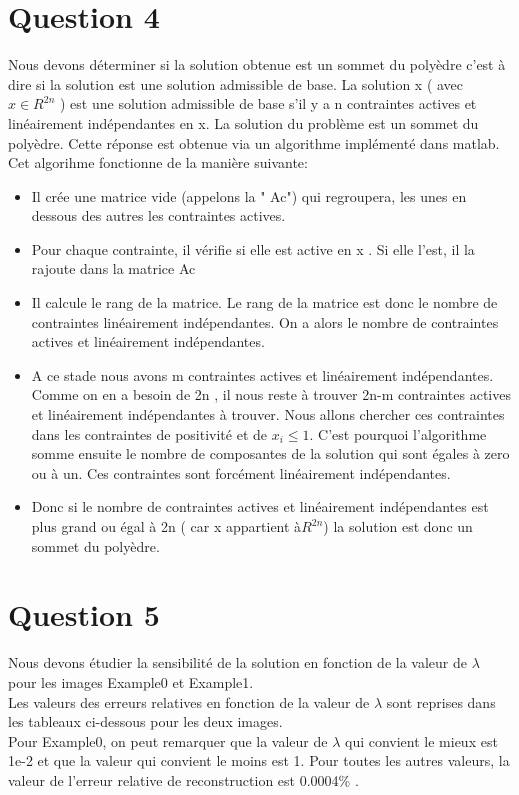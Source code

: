 \documentclass[a4paper, 12pt]{article}
\begin{document}
\section{Question 4}
	Nous devons déterminer si la solution obtenue est un sommet du polyèdre c'est à dire si la solution est une solution admissible de base. La solution x ( avec $ x \in R^{2n}$ ) est une solution admissible de base s'il y a n contraintes actives et linéairement indépendantes en x. 
	La solution du problème est un sommet du polyèdre. Cette réponse est obtenue via un algorithme implémenté dans matlab. Cet algorihme fonctionne de la manière suivante:
\begin{itemize}
	\item Il crée une matrice vide (appelons la " Ac") qui  regroupera,  les unes en dessous des autres les contraintes actives.
	\item Pour chaque contrainte, il vérifie si elle est active en x . Si elle l'est, il la rajoute dans la matrice Ac
	\item Il calcule le rang de la matrice. Le rang de la matrice est donc le nombre de contraintes linéairement indépendantes. On a alors le nombre de contraintes actives et linéairement indépendantes.
	\item A ce stade nous avons m contraintes actives et linéairement indépendantes. Comme on en a besoin de 2n , il nous reste à trouver 2n-m contraintes actives et linéairement indépendantes à trouver. Nous allons chercher ces contraintes dans les contraintes de positivité et de $ x_i\le 1$. C'est pourquoi l'algorithme somme ensuite le nombre de composantes de la solution qui sont égales à zero ou à un. Ces contraintes sont forcément linéairement indépendantes.
	\item Donc si le nombre de contraintes actives et linéairement indépendantes est plus grand ou égal à 2n ( car x appartient à$ R^{2n}$) la solution est donc un sommet du polyèdre.
\end{itemize}
\section{Question 5}
	Nous devons étudier la sensibilité de la solution en fonction de la valeur de $\lambda$ pour les images Example0 et Example1.\\
	Les valeurs des erreurs relatives en fonction de la valeur de $\lambda$ sont reprises dans les tableaux ci-dessous pour les deux images.\\
Pour Example0, on peut remarquer que la valeur de $\lambda$ qui convient le mieux est 1e-2 et que la valeur qui convient le moins est 1. Pour toutes les autres valeurs, la valeur de l'erreur relative de reconstruction est 0.0004\% . \\
\end{document}
